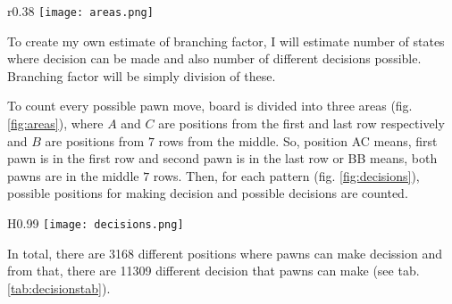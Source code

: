 \begin{wrapfigure}{r}{0.38\textwidth}
  \vspace*{-0.45cm}
  \centering
  \texttt{[image: areas.png]}
  \vspace*{-0.30cm}
  \caption{board areas}
  \label{fig:areas}
  \vspace*{-0.60cm}
\end{wrapfigure}

To create my own estimate of branching factor, I will estimate number of states
where decision can be made and also number of different decisions possible. 
Branching factor will be simply division of these.

To count every possible pawn move, board is divided into three areas
(fig. \ref{fig:areas}), where $A$ and $C$ are positions from the first
and last row respectively and $B$ are positions from $7$ rows from the middle.
So, position AC means, first pawn is in the first row and second pawn is
in the last row or BB means, both pawns are in the middle $7$ rows. Then, for
each pattern (fig. \ref{fig:decisions}), possible positions for making
decision and possible decisions are counted.

\begin{wrapfigure}{H}{0.99\textwidth}
  \vspace*{-12.60cm}
  \centering
  \texttt{[image: decisions.png]}
  \vspace*{-0.25cm}
  \caption{decision patterns}
  \label{fig:decisions}
  \vspace*{-0.60cm}
\end{wrapfigure}

\vspace{12.00cm}
\nobreakspace
In total, there are 3168 different positions where pawns can make decission and
from that, there are 11309 different decision that pawns can make
(see tab. \ref{tab:decisionstab}).
\newpage

\newcommand{\m}[2]{\multicolumn{1}{|#1}{#2}}
\newcommand{\rr}[6]{
  \m{l}{#1} & \m{r}{#2} & \m{r|}{#3} & & \m{l}{#4} & \m{r}{#5} & \m{r|}{#6} \\
}

